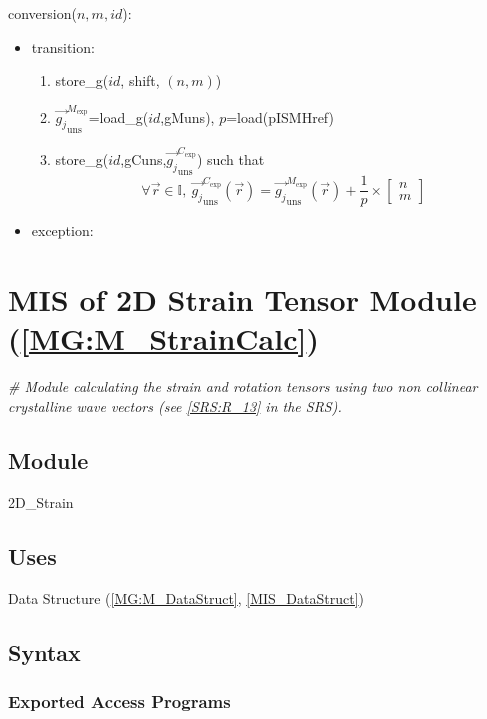 \documentclass[12pt, titlepage]{article}
\begin{document}
\noindent conversion($n,m,id$):
\begin{itemize}
\item transition: 
	\begin{enumerate}
\item store{\_}g($id$, shift, $(n,m)$)
\item 
$\overrightarrow{g_{j}}_{\text{uns}}^{M_{\text{exp}}}$=load{\_}g($id$,gMuns), 
$p$=load(pISMHref)
\item 
store{\_}g($id$,gCuns,$\overrightarrow{g_{j}}_{\text{uns}}^{C_{\text{exp}}}$) 
such that
		\begin{equation*}
		\forall \vec{r} \in \mathbb{I}, \ 
\overrightarrow{g_{j}}_{\text{uns}}^{C_{\text{exp}}}(\vec{r})= 
\overrightarrow{g_{j}}_{\text{uns}}^{M_{\text{exp}}}(\vec{r}) + \frac{1}{p} 
\times \begin{bmatrix}
	n \\
	m
	\end{bmatrix}
		\end{equation*}
		\end{enumerate}
\item exception:
\end{itemize}

\section{MIS of 2D Strain Tensor Module 
(\texorpdfstring{\cref{MG:M_StrainCalc}}))} \label{MIS_StrainCalc}

\noindent\textit{{\#} Module calculating the strain and rotation tensors using 
two non collinear crystalline wave vectors (see \cref{SRS:R_13} in the SRS).}

\subsection{Module}
2D{\_}Strain
\subsection{Uses}
Data Structure (\cref{MG:M_DataStruct}, \cref{MIS_DataStruct})
\subsection{Syntax}

\subsubsection{Exported Access Programs}
\end{document}
